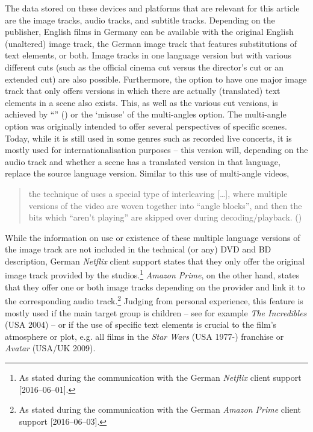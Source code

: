 The data stored on these devices and platforms that are relevant for this article are the image tracks, audio tracks, and subtitle tracks. Depending on the publisher, English films in Germany can be available with the original English (unaltered) image track, the German image track that features substitutions of text elements, or both. Image tracks in one language version but with various different cuts (such as the official cinema cut versus the director’s cut or an extended cut) are also possible. Furthermore, the option to have one major image track that only offers versions in which there are actually (translated) text elements in a scene also exists. This, as well as the various cut versions, is achieved by “” (\citealt{tfdvd_research_labs2005}) or the ‘misuse’ of the multi-angles option. The multi-angle option was originally intended to offer several perspectives of specific scenes. Today, while it is still used in some genres such as recorded live concerts, it is mostly used for internationalisation purposes – this version will, depending on the audio track and whether a scene has a translated version in that language, replace the source language version. Similar to this use of multi-angle videos,
\begin{quote}
the technique of  uses a special type of interleaving […], where multiple versions of the video are woven together into “angle blocks”, and then the bits which “aren’t playing” are skipped over during decoding/playback. (\citealt{tfdvd_research_labs2005})
\end{quote}
While the information on use or existence of these multiple language versions of the image track are not included in the technical (or any) DVD and BD description, German \textit{Netflix} client support states that they only offer the original image track provided by the studios.\footnote{As stated during the communication with the German \textit{Netflix} client support [2016--06--01].} \textit{Amazon Prime}, on the other hand, states that they offer one or both image tracks depending on the provider and link it to the corresponding audio track.\footnote{As stated during the communication with the German \textit{Amazon Prime} client support [2016--06--03].} Judging from personal experience, this feature is mostly used if the main target group is children – see for example \textit{The Incredibles} (USA 2004) – or if the use of specific text elements is crucial to the film’s atmosphere or plot, e.g. all films in the \textit{Star Wars} (USA 1977-) franchise or \textit{Avatar} (USA/UK 2009).

